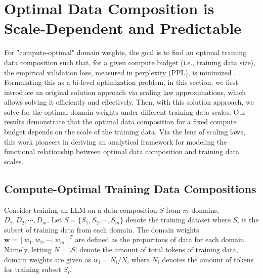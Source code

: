 \documentclass{article} %
\newcommand{\kang}[1]{\textbf{\textcolor{cyan}{[Feiyang: #1]}}}
\begin{document}

\vspace{-0.5em}
\section{Optimal Data Composition is Scale-Dependent and Predictable}\vspace{-0.5em}
\label{sec:ddo}
For "compute-optimal" domain weights, the goal is to find an optimal training data composition such that, for a given compute budget (i.e., training data size), the empirical validation loss, measured in perplexity (PPL), is minimized \citep{xie2024doremi,albalak2023efficient,fan2023doge}.  Formulating this as a bi-level optimization problem, in this section, we first introduce an original solution approach via scaling law approximations, which allows solving it efficiently and effectively. Then, with this solution approach, we solve for the optimal domain weights under different training data scales. Our results demonstrate that the optimal data composition for a fixed compute budget depends on the scale of the training data. Via the lens of scaling laws, this work pioneers in deriving an analytical framework for modeling the functional relationship between optimal data composition and training data scales.

\vspace{-0.5em}\subsection{Compute-Optimal Training Data Compositions}\vspace{-0.5em}




Consider training an LLM on a data composition $S$ from $m$ domains, $D_1, D_2, \cdots, D_m$. Let $S=\{S_1, S_2,\cdots, S_m\}$ denote the training dataset where $S_i$ is the subset of training data from each domain. The domain weights $\mathbf{w}=[w_1,w_2, \cdots, w_m]^T$ are defined as the proportions of data for each domain. Namely, letting $N=|S|$ denote the amount of total tokens of training data, domain weights are given as $w_i = N_i/N$, where $N_i$ denotes the amount of tokens for training subset $S_i$. %
\end{document}
